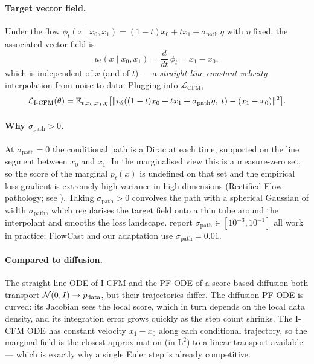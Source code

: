 \paragraph{Target vector field.} Under the flow $\phi_t(x \mid x_0, x_1) = (1 - t)x_0 + t x_1 + \sigma_{\text{path}}\,\eta$ with $\eta$ fixed, the associated vector field is
\begin{equation*}
  u_t(x \mid x_0, x_1) = \frac{d}{dt}\,\phi_t = x_1 - x_0,
\end{equation*}
which is independent of $x$ (and of $t$) --- a \emph{straight-line constant-velocity} interpolation from noise to data. Plugging into $\mathcal{L}_{\text{CFM}}$,
\begin{equation}
  \mathcal{L}_{\text{I-CFM}}(\theta) = \mathbb{E}_{t, x_0, x_1, \eta}\bigl[\|v_\theta((1 - t)x_0 + t x_1 + \sigma_{\text{path}}\eta,\; t) - (x_1 - x_0)\|^2\bigr].
  \label{eq:app-icfm}
\end{equation}

\paragraph{Why $\sigma_{\text{path}} > 0$.} At $\sigma_{\text{path}} = 0$ the conditional path is a Dirac at each time, supported on the line segment between $x_0$ and $x_1$. In the marginalised view this is a measure-zero set, so the score of the marginal $p_t(x)$ is undefined on that set and the empirical loss gradient is extremely high-variance in high dimensions (Rectified-Flow pathology; see \citealp{liu2022rectifiedflow}). Taking $\sigma_{\text{path}} > 0$ convolves the path with a spherical Gaussian of width $\sigma_{\text{path}}$, which regularises the target field onto a thin tube around the interpolant and smooths the loss landscape. \citet{tong2024improving} report $\sigma_{\text{path}} \in [10^{-3}, 10^{-1}]$ all work in practice; FlowCast and our adaptation use $\sigma_{\text{path}} = 0.01$.

\paragraph{Compared to diffusion.} The straight-line ODE of I-CFM and the PF-ODE of a score-based diffusion both transport $\mathcal{N}(0, I) \to p_{\text{data}}$, but their trajectories differ. The diffusion PF-ODE is curved: its Jacobian sees the local score, which in turn depends on the local data density, and its integration error grows quickly as the step count shrinks. The I-CFM ODE has constant velocity $x_1 - x_0$ along each conditional trajectory, so the marginal field is the closest approximation (in $\mathrm{L}^2$) to a linear transport available --- which is exactly why a single Euler step is already competitive.

